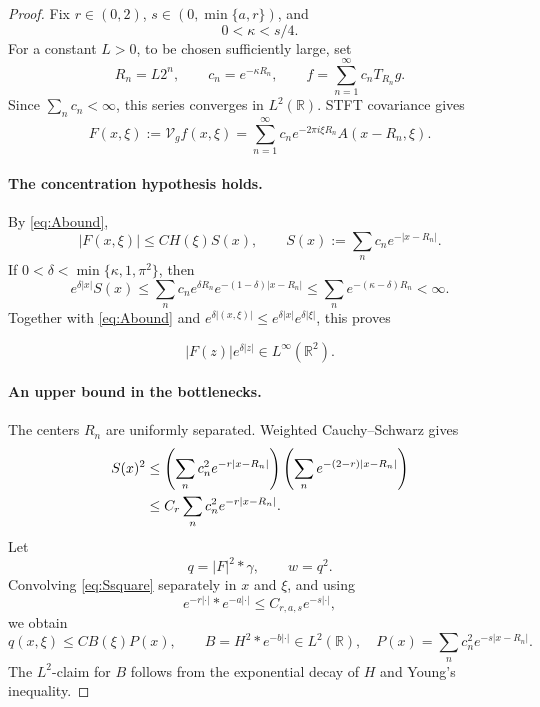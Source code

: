 \documentclass[11pt]{article}
\newcommand{\R}{\mathbb R}
\newcommand{\V}{\mathcal V}
\begin{document}
\begin{proof}
Fix \(r\in(0,2)\), \(s\in(0,\min\{a,r\})\), and
\begin{equation}\label{eq:kappachoice}
 0<\kappa<s/4.
\end{equation}
For a constant \(L>0\), to be chosen sufficiently large, set
\[
 R_n=L2^n,\qquad c_n=e^{-\kappa R_n},\qquad
 f=\sum_{n=1}^\infty c_nT_{R_n}g.
\]
Since \(\sum_nc_n<\infty\), this series converges in \(L^2(\R)\).
STFT covariance gives
\begin{equation}\label{eq:Fsum}
 F(x,\xi):=\V_gf(x,\xi)
 =\sum_{n=1}^\infty c_ne^{-2\pi i\xi R_n}A(x-R_n,\xi).
\end{equation}

\paragraph{The concentration hypothesis holds.}
By \eqref{eq:Abound},
\[
 |F(x,\xi)|\le CH(\xi)S(x),\qquad
 S(x):=\sum_nc_ne^{-|x-R_n|}.
\]
If \(0<\delta<\min\{\kappa,1,\pi^2\}\), then
\[
 e^{\delta|x|}S(x)
 \le\sum_nc_ne^{\delta R_n}e^{-(1-\delta)|x-R_n|}
 \le\sum_ne^{-(\kappa-\delta)R_n}<\infty.
\]
Together with \eqref{eq:Abound} and
\(e^{\delta|(x,\xi)|}\le e^{\delta|x|}e^{\delta|\xi|}\), this proves

\[
 |F(z)|e^{\delta|z|}\in L^\infty(\R^2).
\]

\paragraph{An upper bound in the bottlenecks.}
The centers \(R_n\) are uniformly separated.  Weighted Cauchy--Schwarz gives
\begin{align}
 S(x)^2
 &\le
 \left(\sum_nc_n^2e^{-r|x-R_n|}\right)
 \left(\sum_ne^{-(2-r)|x-R_n|}\right)\notag\\
 &\le C_r\sum_nc_n^2e^{-r|x-R_n|}.\label{eq:Ssquare}
\end{align}
Let
\[
 q=|F|^2*\gamma,\qquad w=q^2.
\]
Convolving \eqref{eq:Ssquare} separately in \(x\) and \(\xi\), and using
\[
 e^{-r|\cdot|}*e^{-a|\cdot|}\le C_{r,a,s}e^{-s|\cdot|},
\]
we obtain
\begin{equation}\label{eq:qbound}
 q(x,\xi)\le C B(\xi)P(x),\qquad
 B=H^2*e^{-b|\cdot|}\in L^2(\R),\quad
 P(x)=\sum_nc_n^2e^{-s|x-R_n|}.
\end{equation}
The \(L^2\)-claim for \(B\) follows from the exponential decay of \(H\) and
Young's inequality.


\end{proof}
\end{document}
